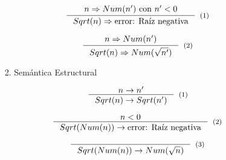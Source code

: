 \documentclass{article}
\begin{document}
\begin{enumerate}
\begin{itemize}
\begin{enumerate}
\begin{enumerate}
                    \[
                        \inference{n \Rightarrow Num(n') \text{ con } n' < 0}{Sqrt(n) \Rightarrow \text{error: Raíz negativa}}[(1)]
                    \]

                    \[
                        \inference{n \Rightarrow Num(n')}{Sqrt(n) \Rightarrow Num(\sqrt{n'})}[(2)]
                    \]
                
                \item Semántica Estructural

                    \[
                        \inference{n \rightarrow n'}{Sqrt(n) \rightarrow Sqrt(n')}[(1)]
                    \]

                    \[
                        \inference{n < 0}{Sqrt(Num(n)) \rightarrow \text{error: Raíz negativa}}[(2)]
                    \]

                    \[
                        \inference{}{Sqrt(Num(n)) \rightarrow Num(\sqrt{n})}[(3)]
                    \]
                    
            \end{enumerate}
        \end{enumerate}
         
    \end{itemize}

\end{enumerate}
\end{document}
